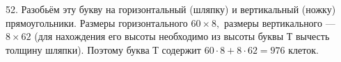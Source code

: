 52. Разобьём эту букву на горизонтальный (шляпку) и вертикальный (ножку) прямоугольники. Размеры горизонтального $60\times8,$ размеры вертикального --- $8\times62$ (для нахождения его высоты необходимо из высоты буквы Т вычесть толщину шляпки). Поэтому буква Т содержит $60\cdot8+8\cdot62=976$ клеток.\\
